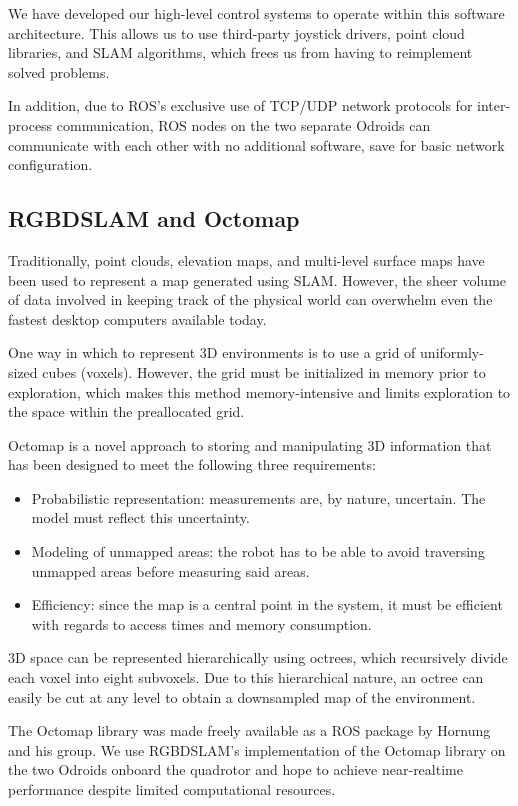 \documentclass[12pt,letterpaper]{article} \usepackage[margin=1in]{geometry}
\begin{document}
We have developed our high-level control systems to operate within this
software architecture. This allows us to use third-party joystick drivers,
point cloud libraries, and SLAM algorithms, which frees us from having to
reimplement solved problems.

In addition, due to ROS’s exclusive use of TCP/UDP network protocols for
inter-process communication, ROS nodes on the two separate Odroids can
communicate with each other with no additional software, save for basic network
configuration.


\subsection*{RGBDSLAM and Octomap}

Traditionally, point clouds, elevation maps, and multi-level surface maps have
been used to represent a map generated using SLAM. However, the sheer volume of
data involved in keeping track of the physical world can overwhelm even the
fastest desktop computers available today.

One way in which to represent 3D environments is to use a grid of
uniformly-sized cubes (voxels). However, the grid must be initialized in memory
prior to exploration, which makes this method memory-intensive and limits
exploration to the space within the preallocated grid.

Octomap is a novel approach to storing and manipulating 3D information that has
been designed to meet the following three requirements:

\begin{itemize}
	\item Probabilistic representation: measurements are, by nature, uncertain.
		The model must reflect this uncertainty.
	\item Modeling of unmapped areas: the robot has to be able to avoid
		traversing unmapped areas before measuring said areas.
	\item Efficiency: since the map is a central point in the system, it must
		be efficient with regards to access times and memory consumption.
\end{itemize}

3D space can be represented hierarchically using octrees, which recursively
divide each voxel into eight subvoxels. Due to this hierarchical nature, an
octree can easily be cut at any level to obtain a downsampled map of the
environment.

The Octomap library was made freely available as a ROS package by Hornung and
his group. We use RGBDSLAM’s implementation of the Octomap library on the two
Odroids onboard the quadrotor and hope to achieve near-realtime performance
despite limited computational resources.
\end{document}
